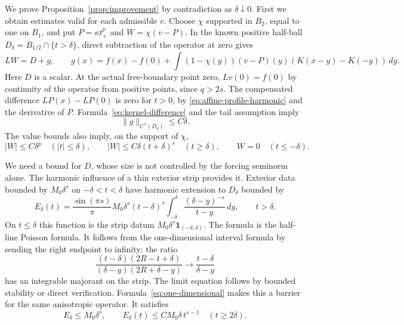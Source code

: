 \documentclass[11pt]{article}
\numberwithin{equation}{section}
\begin{document}
We prove Proposition~\ref{prop:improvement} by contradiction as
$\delta\downarrow0$. First we obtain estimates valid for each admissible
$v$. Choose $\chi$ supported in $B_2$, equal to one on $B_1$, and put
$P=\kappa t_+^p$ and $W=\chi(v-P)$. In the known positive half-ball
$D_\delta=B_{1/2}\cap\{t>\delta\}$, direct subtraction of the operator at
zero gives
\begin{equation}\label{eq:W-equation}
 LW=D+g,\qquad
 g(x)=f(x)-f(0)+\int(1-\chi(y))(v-P)(y)
                         (K(x-y)-K(-y))\,dy.
\end{equation}
Here $D$ is a scalar. At the actual free-boundary point zero, $Lv(0)=f(0)$
by continuity of the operator from positive points, since $q>2s$.
The compensated difference $LP(x)-LP(0)$ is zero for $t>0$, by
\eqref{eq:affine-profile-harmonic} and the derivative of $P$.
Formula~\eqref{eq:kernel-difference} and the tail assumption imply
\begin{equation}\label{eq:g-bound}
                      \|g\|_{C^\gamma(D_\delta)}\leq C\delta.
\end{equation}
The value bounds also imply, on the support of $\chi$,
\begin{equation}\label{eq:W-values}
 |W|\leq C\delta^p\quad(|t|\leq\delta),\qquad
 |W|\leq C\delta(t+\delta)^s\quad(t\geq\delta),\qquad
 W=0\quad(t\leq-\delta).
\end{equation}

We need a bound for $D$, whose size is not controlled by the forcing
seminorm alone. The harmonic influence of a thin exterior strip provides
it. Exterior data bounded by $M_0\delta^s$ on
$-\delta<t<\delta$ have harmonic extension to $D_\delta$ bounded by
\begin{equation}\label{eq:strip-barrier}
 E_\delta(t)=\frac{\sin(\pi s)}{\pi}M_0\delta^s(t-\delta)^s
       \int_{-\delta}^{\delta}\frac{(\delta-y)^{-s}}{t-y}\,dy,
                         \qquad t>\delta.
\end{equation}
On $t\leq\delta$ this function is the strip datum
$M_0\delta^s\mathbf1_{(-\delta,\delta)}$. The formula is the half-line
Poisson formula. It follows from the one-dimensional interval formula
\cite[Proposition 1.10.10]{FRRO} by sending the right endpoint to infinity:
the ratio
\[
 \frac{(t-\delta)(2R-t+\delta)}{(\delta-y)(2R+\delta-y)}
                       \longrightarrow\frac{t-\delta}{\delta-y}
\]
has an integrable majorant on the strip. The limit equation follows by
bounded stability or direct verification. Formula~\eqref{eq:one-dimensional}
makes this a barrier for the same anisotropic operator. It satisfies
\begin{equation}\label{eq:strip-decay}
 E_\delta\leq M_0\delta^s,
 \qquad E_\delta(t)\leq CM_0\delta\,t^{s-1}\quad(t\geq2\delta).
\end{equation}
\end{document}
